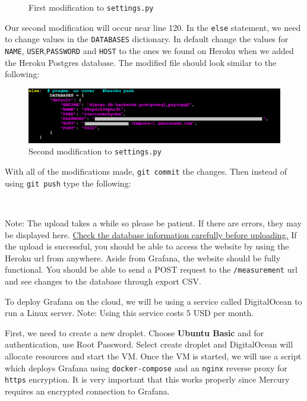 \documentclass[12pt, letterpaper]{article}
\begin{document}
{{{{{{{{{{{{\begin{figure}[h!]
	\caption{First modification to \texttt{settings.py}}
	\end{figure}	
\par Our second modification will occur near line 120. In the \texttt{else} statement, we need to change values in the \texttt{DATABASES} dictionary. In default change the values for \texttt{NAME}, \texttt{USER},\texttt{PASSWORD} and \texttt{HOST} to the ones we found on Heroku when we added the Heroku Postgres database. The modified file should look similar to the following:
\begin{figure}[h!]
	\centering
	\includegraphics[width=1\columnwidth]{assets/database_info.png}
	\caption{Second modification to \texttt{settings.py}}
	\end{figure}	

With all of the modifications made, \texttt{git commit} the changes. Then instead of using \texttt{git push} type the following: \\

\par{} \\

\par Note: The upload takes a while so please be patient. If there are errors, they may be displayed here. \underline{Check the database information carefully before uploading.} If the upload is successful, you should be able to access the website by using the Heroku url from anywhere. Aside from Grafana, the website should be fully functional. You should be able to send a POST request to the \texttt{/measurement} url and see changes to the database through export CSV. 

\par To deploy Grafana on the cloud, we will be using a service called DigitalOcean to run a Linux server. Note: Using this service costs 5 USD per month. 
\par First, we need to create a new droplet. Choose \textbf{Ubuntu Basic} and for authentication, use Root Password. Select create droplet and DigitalOcean will allocate resources and start the VM. Once the VM is started, we will use a script which deploys Grafana using \texttt{docker-compose} and an \texttt{nginx} reverse proxy for \texttt{https} encryption. It is very important that this works properly since Mercury requires an encrypted connection to Grafana. 

}}}}}}}}}}}}
\end{document}
